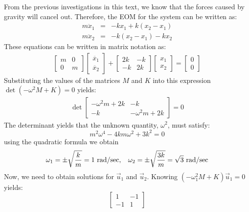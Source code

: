 \documentclass[12pt,letter]{article}
\begin{document}
\begin{example}
	\noindent  From the previous investigations in this text, we know that the forces caused by gravity will cancel out. Therefore, the EOM for the system can be written as:
	\begin{eqnarray}
	m\ddot{x}_1 &= & -kx_1 + k(x_2-x_1) \\
	m\ddot{x}_2&= & -k(x_2-x_1) -kx_2 \nonumber
	\end{eqnarray}
	These equations can be written in matrix notation as:
	\begin{eqnarray}
		\begin{bmatrix} m & 0  \\  0 & m \end{bmatrix}\begin{bmatrix} \ddot{x_1} \\  \ddot{x_2} \end{bmatrix} + \begin{bmatrix} 2k & -k  \\  -k & 2k \end{bmatrix}\begin{bmatrix} x_1 \\  x_2 \end{bmatrix} = \begin{bmatrix} 0 \\  0 \end{bmatrix}
	\end{eqnarray}
	Substituting the values of the matrices $M$ and $K$ into this expression $\det(-\omega^2 M  + K) = 0$ yields: 
	\begin{eqnarray}
	\det\begin{bmatrix} -\omega^2 m + 2k & -k  \\  -k & -\omega^2 m + 2k \end{bmatrix}=0
	\end{eqnarray}
	The determinant yields that the unknown quantity, $\omega^2$, must satisfy:
	\begin{equation}
	m^2 \omega^4 - 4km\omega^2 + 3k^2 = 0
	\end{equation}
	using the quadratic formula we obtain
	\begin{equation}
	\omega_1 = \pm \sqrt{\frac{k}{m}}=1 \text{ rad/sec}, \hspace{2ex} \omega_2 = \pm \sqrt{\frac{3k}{m}}=\sqrt{3} \text{ rad/sec}
	\end{equation}
	Now, we need to obtain solutions for $\vec{u}_1$ and $\vec{u}_2$. Knowing $(-\omega_1^2 M  + K)\vec{u}_1 =0$ yields:
	\begin{equation}
		 \begin{bmatrix} 1 & -1 \\    -1  & 1 \end{bmatrix} 

\end{equation}
\end{example}
\end{document}
